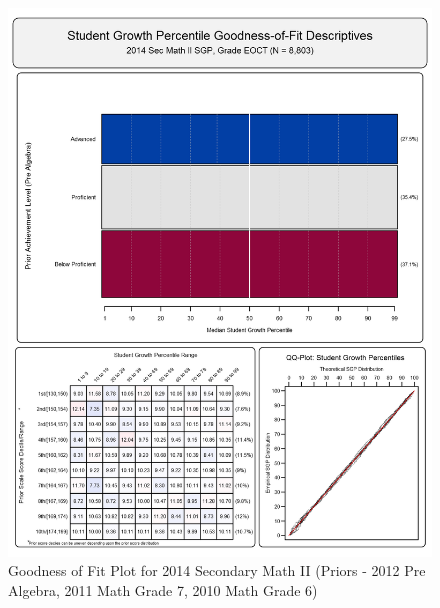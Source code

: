 \documentclass[12pt]{article}
\begin{document}
\begin{figure}[htbp]
\centering
\includegraphics{../img/Goodness_of_Fit/SEC_MATH_II.2014/2014_SEC_MATH_II_EOCT;2012_PRE_ALGEBRA_EOCT;2011_MATH_7;2010_MATH_6.png}
\caption{Goodness of Fit Plot for 2014 Secondary Math II (Priors - 2012
Pre Algebra, 2011 Math Grade 7, 2010 Math Grade 6)}
\end{figure}
\end{document}
